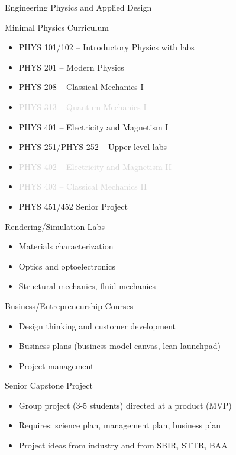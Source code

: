 \documentclass[xcolor=table,compress,professionalfonts,pdfpagelabels]{beamer}
\begin{document}
\begin{frame}[allowframebreaks]{Engineering Physics and Applied Design}
 \begin{block}{Minimal Physics Curriculum}
  \begin{itemize}
   \item PHYS 101/102 – Introductory Physics with labs
   \item PHYS 201 – Modern Physics
   \item PHYS 208 – Classical Mechanics I
   \item \textcolor{lightgray}{PHYS 313 – Quantum Mechanics I}
   \item PHYS 401 – Electricity and Magnetism I
   \item PHYS 251/PHYS 252 – Upper level labs
   \item \textcolor{lightgray}{PHYS 402 –  Electricity and Magnetism II}
   \item \textcolor{lightgray}{PHYS 403 – Classical Mechanics II}
   \item PHYS 451/452 Senior Project
  \end{itemize}
 \end{block}
 \begin{block}{Rendering/Simulation Labs}
  \begin{itemize}
   \item Materials characterization
   \item Optics and optoelectronics
   \item Structural mechanics, fluid mechanics
  \end{itemize}
 \end{block}
 \begin{block}{Business/Entrepreneurship Courses}
  \begin{itemize}
   \item Design thinking and customer development
   \item Business plans (business model canvas, lean launchpad)
   \item Project management
  \end{itemize}
 \end{block}
 \begin{block}{Senior Capstone Project}
  \begin{itemize}
   \item Group project (3-5 students) directed at a product (MVP)
   \item Requires: science plan, management plan, business plan
   \item Project ideas from industry and from SBIR, STTR, BAA

\end{itemize}
\end{block}
\end{frame}
\end{document}
